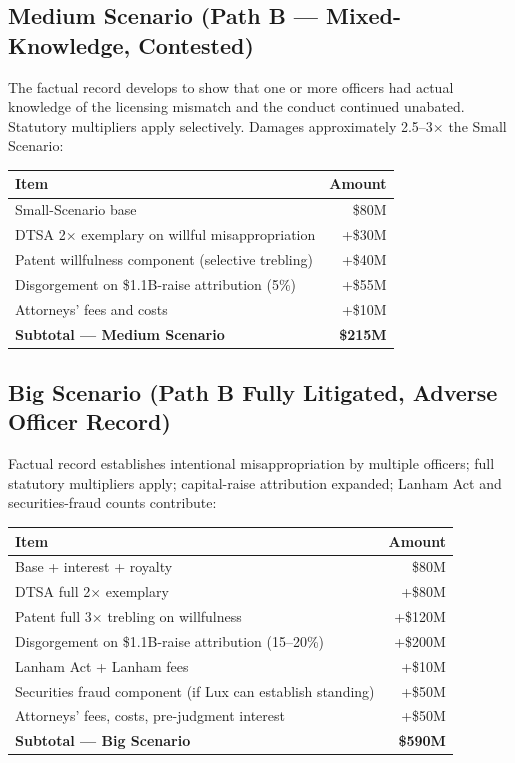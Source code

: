 \documentclass[11pt,letterpaper]{article}
\begin{document}
\subsection*{Medium Scenario (Path B --- Mixed-Knowledge, Contested)}

The factual record develops to show that one or more officers had
actual knowledge of the licensing mismatch and the conduct continued
unabated. Statutory multipliers apply selectively. Damages
approximately 2.5--3$\times$ the Small Scenario:

\begin{center}
\begin{tabular}{lr}
\toprule
\textbf{Item} & \textbf{Amount} \\
\midrule
Small-Scenario base & \$80M \\
DTSA 2$\times$ exemplary on willful misappropriation & +\$30M \\
Patent willfulness component (selective trebling) & +\$40M \\
Disgorgement on \$1.1B-raise attribution (5\%) & +\$55M \\
Attorneys' fees and costs & +\$10M \\
\midrule
\textbf{Subtotal --- Medium Scenario} & \textbf{\$215M} \\
\bottomrule
\end{tabular}
\end{center}

\subsection*{Big Scenario (Path B Fully Litigated, Adverse Officer Record)}

Factual record establishes intentional misappropriation by multiple
officers; full statutory multipliers apply; capital-raise attribution
expanded; Lanham Act and securities-fraud counts contribute:

\begin{center}
\begin{tabular}{lr}
\toprule
\textbf{Item} & \textbf{Amount} \\
\midrule
Base + interest + royalty & \$80M \\
DTSA full 2$\times$ exemplary & +\$80M \\
Patent full 3$\times$ trebling on willfulness & +\$120M \\
Disgorgement on \$1.1B-raise attribution (15--20\%) & +\$200M \\
Lanham Act + Lanham fees & +\$10M \\
Securities fraud component (if Lux can establish standing) & +\$50M \\
Attorneys' fees, costs, pre-judgment interest & +\$50M \\
\midrule
\textbf{Subtotal --- Big Scenario} & \textbf{\$590M} \\
\bottomrule
\end{tabular}
\end{center}
\end{document}
